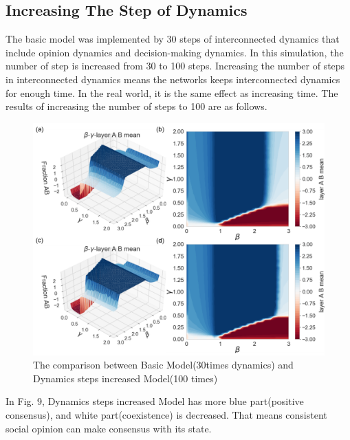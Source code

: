 \documentclass[english]{cccconf}
\begin{document}
\subsection{Increasing The Step of Dynamics}
The basic model was implemented by 30 steps of interconnected dynamics that include opinion dynamics and decision-making dynamics. In this simulation, the number of step is increased from 30 to 100 steps. Increasing the number of steps in interconnected dynamics means the networks keeps interconnected dynamics for enough time.  In the real world, it is the same effect as increasing time. 
The results of increasing the number of steps to 100 are as follows.
\begin{figure}[!htb]
  \centering
  \includegraphics[width=\hsize]{FIG9.png}
  \caption{The comparison between Basic Model(30times dynamics) and Dynamics steps increased Model(100 times)}
  \label{Fig9}
\end{figure}

In Fig. 9, Dynamics steps increased Model has more blue part(positive consensus), and white part(coexistence) is decreased. That means consistent social opinion can make consensus with its state.
\end{document}
